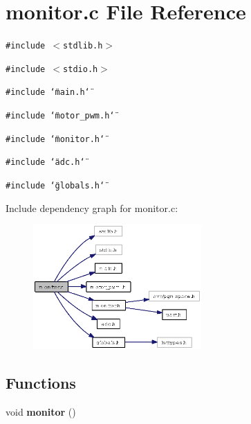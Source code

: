 \section{monitor.c File Reference}
\label{monitor_8c}
{\tt \#include $<$stdlib.h$>$}\par
{\tt \#include $<$stdio.h$>$}\par
{\tt \#include \char`\"{}main.h\char`\"{}}\par
{\tt \#include \char`\"{}motor\_\-pwm.h\char`\"{}}\par
{\tt \#include \char`\"{}monitor.h\char`\"{}}\par
{\tt \#include \char`\"{}adc.h\char`\"{}}\par
{\tt \#include \char`\"{}globals.h\char`\"{}}\par


Include dependency graph for monitor.c:\begin{figure}[H]
\begin{center}
\leavevmode
\includegraphics[width=182pt]{monitor_8c__incl}
\end{center}
\end{figure}
\subsection*{Functions}
\begin{CompactItemize}
\item 
void {\bf monitor} ()
\end{CompactItemize}
